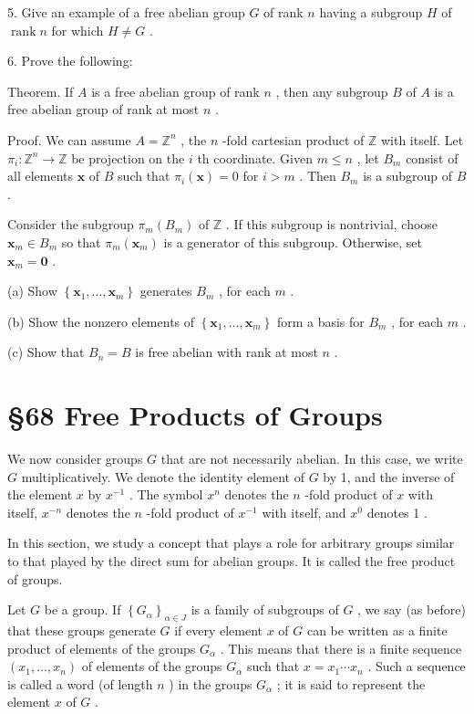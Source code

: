 \documentclass[10pt]{article}
\begin{document}
5. Give an example of a free abelian group \(G\) of rank \(n\) having a subgroup \(H\) of \(\operatorname{rank}n\) for which \(H \neq  G\) .

6. Prove the following:

Theorem. If \(A\) is a free abelian group of rank \(n\) , then any subgroup \(B\) of \(A\) is a free abelian group of rank at most \(n\) .

Proof. We can assume \(A = {\mathbb{Z}}^{n}\) , the \(n\) -fold cartesian product of \(\mathbb{Z}\) with itself. Let \({\pi }_{i} : {\mathbb{Z}}^{n} \rightarrow  \mathbb{Z}\) be projection on the \(i\) th coordinate. Given \(m \leq  n\) , let \({B}_{m}\) consist of all elements \(\mathbf{x}\) of \(B\) such that \({\pi }_{i}\left( \mathbf{x}\right)  = 0\) for \(i > m\) . Then \({B}_{m}\) is a subgroup of \(B\) .

Consider the subgroup \({\pi }_{m}\left( {B}_{m}\right)\) of \(\mathbb{Z}\) . If this subgroup is nontrivial, choose \({\mathbf{x}}_{m} \in  {B}_{m}\) so that \({\pi }_{m}\left( {\mathbf{x}}_{m}\right)\) is a generator of this subgroup. Otherwise, set \({\mathbf{x}}_{m} = \mathbf{0}\) .

(a) Show \(\left\{  {{\mathbf{x}}_{1},\ldots ,{\mathbf{x}}_{m}}\right\}\) generates \({B}_{m}\) , for each \(m\) .

(b) Show the nonzero elements of \(\left\{  {{\mathbf{x}}_{1},\ldots ,{\mathbf{x}}_{m}}\right\}\) form a basis for \({B}_{m}\) , for each \(m\) .

(c) Show that \({B}_{n} = B\) is free abelian with rank at most \(n\) .

\section*{§68 Free Products of Groups}

We now consider groups \(G\) that are not necessarily abelian. In this case, we write \(G\) multiplicatively. We denote the identity element of \(G\) by 1, and the inverse of the element \(x\) by \({x}^{-1}\) . The symbol \({x}^{n}\) denotes the \(n\) -fold product of \(x\) with itself, \({x}^{-n}\) denotes the \(n\) -fold product of \({x}^{-1}\) with itself, and \({x}^{0}\) denotes 1 .

In this section, we study a concept that plays a role for arbitrary groups similar to that played by the direct sum for abelian groups. It is called the free product of groups.

Let \(G\) be a group. If \({\left\{  {G}_{\alpha }\right\}  }_{\alpha  \in  J}\) is a family of subgroups of \(G\) , we say (as before) that these groups generate \(G\) if every element \(x\) of \(G\) can be written as a finite product of elements of the groups \({G}_{\alpha }\) . This means that there is a finite sequence \(\left( {{x}_{1},\ldots ,{x}_{n}}\right)\) of elements of the groups \({G}_{\alpha }\) such that \(x = {x}_{1}\cdots {x}_{n}\) . Such a sequence is called a word (of length \(n\) ) in the groups \({G}_{\alpha }\) ; it is said to represent the element \(x\) of \(G\) .
\end{document}
